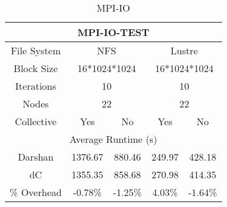 \begin{table}[h]
    \begin{subtable}[h]{0.45\textwidth}
    \vspace{0.5cm}
        \centering
        \setlength\tabcolsep{5pt}
        \begin{tabular}{|ccccc|}
        \hline
        \multicolumn{5}{|c|}{MPI-IO-TEST}                                                                                                                                \\ \hline
        \multicolumn{1}{|c|}{File System}      & \multicolumn{2}{c|}{NFS}                                              & \multicolumn{2}{c|}{Lustre}                     \\ \hline
        \multicolumn{1}{|c|}{Block Size}       & \multicolumn{2}{c|}{16*1024*1024}                                     & \multicolumn{2}{c|}{16*1024*1024}               \\ \hline
        \multicolumn{1}{|c|}{Iterations}       & \multicolumn{2}{c|}{10}                                               & \multicolumn{2}{c|}{10}                         \\ \hline
        \multicolumn{1}{|c|}{Nodes}            & \multicolumn{2}{c|}{22}                                               & \multicolumn{2}{c|}{22}                         \\ \hline
        \multicolumn{1}{|c|}{Collective}       & \multicolumn{1}{c|}{Yes}          & \multicolumn{1}{c|}{No}           & \multicolumn{1}{c|}{Yes}         & No           \\ \hline
        \multicolumn{5}{|c|}{Average Runtime (s)}                                                                                                                            \\ \hline
        \multicolumn{1}{|c|}{Darshan}          & \multicolumn{1}{c|}{1376.67}  & \multicolumn{1}{c|}{880.46}  & \multicolumn{1}{c|}{249.97} & 428.18  \\ \hline
        \multicolumn{1}{|c|}{dC} & \multicolumn{1}{c|}{1355.35}  & \multicolumn{1}{c|}{858.68}  & \multicolumn{1}{c|}{270.98} & 414.35  \\ \hline
        \multicolumn{1}{|c|}{\% Overhead}      & \multicolumn{1}{c|}{-0.78\%} & \multicolumn{1}{c|}{-1.25\%} & \multicolumn{1}{c|}{4.03\%} & -1.64\% \\ \hline
        \end{tabular}
    \caption{MPI-IO} 
    \label{subtable:MPI-IO-TEST}
    \vspace{0.5cm}

\end{subtable}
\end{table}
